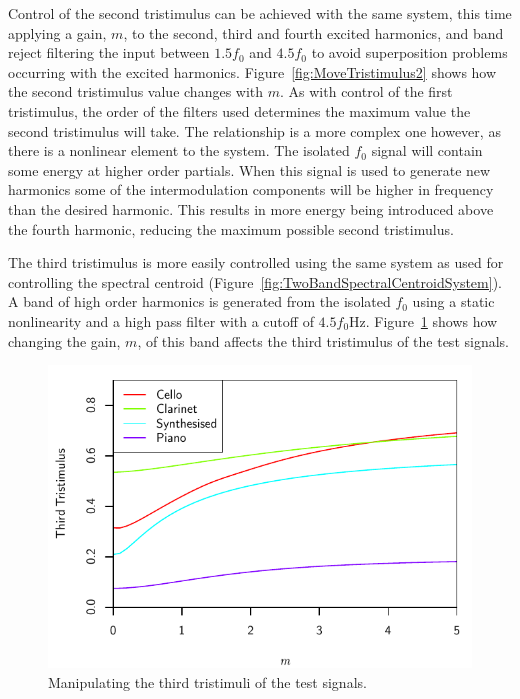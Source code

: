 		Control of the second tristimulus can be achieved with the same system, this time applying a gain, $m$, to
		the second, third and fourth excited harmonics, and band reject filtering the input between $1.5f_{0}$ and
		$4.5f_{0}$ to avoid superposition problems occurring with the excited harmonics.
		Figure~\ref{fig:MoveTristimulus2} shows how the second tristimulus value changes with $m$. As with control
		of the first tristimulus, the order of the filters used determines the maximum value the second tristimulus
		will take. The relationship is a more complex one however, as there is a nonlinear element to the system.
		The isolated $f_{0}$ signal will contain some energy at higher order partials.  When this signal is used to
		generate new harmonics some of the intermodulation components will be higher in frequency than the desired
		harmonic. This results in more energy being introduced above the fourth harmonic, reducing the maximum
		possible second tristimulus.

		The third tristimulus is more easily controlled using the same system as used for controlling the spectral
		centroid (Figure~\ref{fig:TwoBandSpectralCentroidSystem}). A band of high order harmonics is generated from
		the isolated $f_{0}$ using a static nonlinearity and a high pass filter with a cutoff of $4.5f_{0}$Hz.
		Figure~\ref{fig:MoveTristimulus3} shows how changing the gain, $m$, of this band affects the third
		tristimulus of the test signals.

		\begin{figure}[h!]
			\centering
			\includegraphics{chapter6/Images/MoveTristimulus3.pdf}
			\caption{Manipulating the third tristimuli of the test signals.}
			\label{fig:MoveTristimulus3}
		\end{figure}

